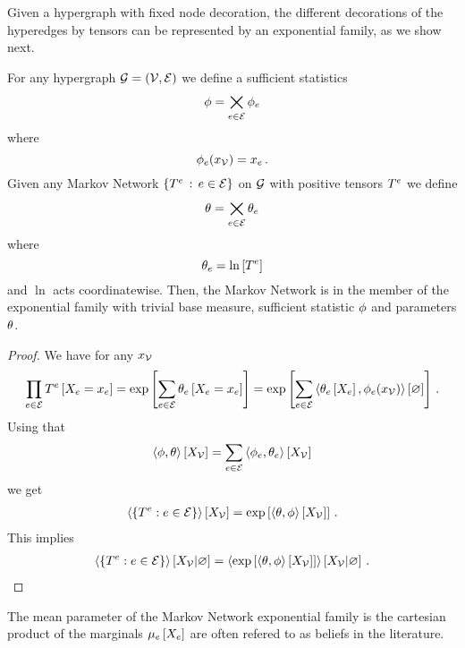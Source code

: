 Given a hypergraph with fixed node decoration, the different decorations of the hyperedges by tensors can be represented by an exponential family, as we show next.

\begin{theorem}
	For any hypergraph $\mathcal{G}=(\mathcal{V},\mathcal{E})$ we define a sufficient statistics 
		\[ \phi = \bigtimes_{e\in\mathcal{E}}  \phi_{e} \]
	where 
		\[ \phi_{e}(x_{\mathcal{V}}) = x_{e} \, . \]
	Given any Markov Network $\{T^{e} \, : \, e\in\mathcal{E}\}$ on $\mathcal{G}$ with positive tensors $T^{e}$ we define
		\[ \theta = \bigtimes_{e\in\mathcal{E}} \theta_{e} \]
	where
		\[ \theta_{e} =  \ln \left[ T^{e} \right] \]
	and $\ln$ acts coordinatewise.
	Then, the Markov Network is in the member of the exponential family with trivial base measure, sufficient statistic $\phi$ and parameters $\theta$.
\end{theorem}
\begin{proof}
	We have for any $x_{\mathcal{V}}$
	\begin{align}
	\prod_{e\in\mathcal{E}} T^{e}\left[X_{e}=x_{e}\right]
		= \mathrm{exp}\left[\sum_{e\in\mathcal{E}} \theta_{e}\left[X_{e}=x_{e}\right]\right]
		= \mathrm{exp}\left[\sum_{e\in\mathcal{E}} \left\langle \theta_{e}\left[X_{e}\right],\phi_{e}(x_{\mathcal{V}})\right\rangle \left[ \varnothing \right]\right]  \, .
	\end{align}
	Using that
		\[ \left\langle \phi,\theta\right\rangle \left[ X_{\mathcal{V}} \right] = \sum_{e\in\mathcal{E}} \left\langle \phi_{e},\theta_{e}\right\rangle \left[ X_{\mathcal{V}} \right] \]
	we get
	\begin{align}
		\left\langle \{T^{e}: e\in\mathcal{E}\}\right\rangle \left[ X_{\mathcal{V}} \right] = \mathrm{exp}\left[\left\langle \theta,\phi\right\rangle \left[ X_{\mathcal{V}} \right]\right] \, .
	\end{align}
	This implies 
	\begin{align}
		\left\langle \{T^{e}: e\in\mathcal{E}\}\right\rangle \left[ X_{\mathcal{V}} | \varnothing \right] = \left\langle \mathrm{exp}\left[\left\langle \theta,\phi\right\rangle \left[ X_{\mathcal{V}} \right]\right]\right\rangle \left[ X_{\mathcal{V}} | \varnothing \right] \, .
	\end{align}
\end{proof}


The mean parameter of the Markov Network exponential family is the cartesian product of the marginals $\mu_{e}\left[X_{e}\right]$ are often refered to as beliefs in the literature.

